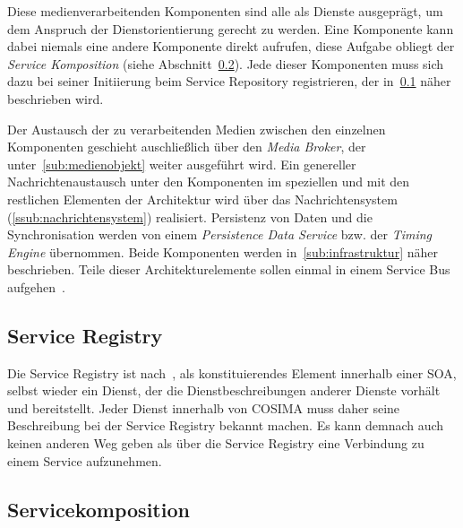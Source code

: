   Diese medienverarbeitenden Komponenten sind alle als Dienste ausgeprägt, um dem Anspruch der Dienstorientierung gerecht zu werden. Eine Komponente kann dabei niemals eine andere Komponente direkt aufrufen, diese Aufgabe obliegt der \emph{Service Komposition} (siehe Abschnitt~\ref{sub:service_komposition}). Jede dieser Komponenten muss sich dazu bei seiner Initiierung beim Service Repository registrieren, der in~\ref{sub:service_registry} näher beschrieben wird.
  
  Der Austausch der zu verarbeitenden Medien zwischen den einzelnen Komponenten geschieht auschließlich über den \emph{Media Broker}, der unter~\ref{sub:medienobjekt} weiter ausgeführt wird. Ein genereller Nachrichtenaustausch unter den Komponenten im speziellen und mit den restlichen Elementen der Architektur wird über das Nachrichtensystem (\ref{ssub:nachrichtensystem}) realisiert. Persistenz von Daten und die Synchronisation werden von einem \emph{Persistence Data Service} bzw. der \emph{Timing Engine} übernommen. Beide Komponenten werden in~\ref{sub:infrastruktur} näher beschrieben. Teile dieser Architekturelemente sollen einmal in einem Service Bus aufgehen~\citep[S. 18]{bericht}.


\subsection{Service Registry} %
\label{sub:service_registry}

  Die Service Registry ist nach~\citep{service_oriented_computing}, als konstituierendes Element innerhalb einer SOA, selbst wieder ein Dienst, der die Dienstbeschreibungen anderer Dienste vorhält und bereitstellt. Jeder Dienst innerhalb von COSIMA muss daher seine Beschreibung bei der Service Registry bekannt machen. Es kann demnach auch keinen anderen Weg geben als über die Service Registry eine Verbindung zu einem Service aufzunehmen.



\subsection{Servicekomposition} %
\label{sub:service_komposition}

